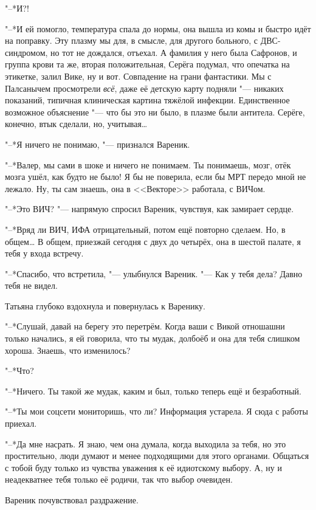 "--*И?!

"--*И ей помогло, температура спала до нормы, она вышла из комы и быстро идёт на поправку.
Эту плазму мы для, в смысле, для другого больного, с ДВС-синдромом, но тот не дождался, отъехал.
А фамилия у него была Сафронов, и группа крови та же, вторая положительная, Серёга подумал, что опечатка на этикетке, залил Вике, ну и вот.
Совпадение на грани фантастики.
Мы с Палсанычем просмотрели \emph{всё}, даже её детскую карту подняли "--- никаких показаний, типичная клиническая картина тяжёлой инфекции.
Единственное возможное объяснение "--- что бы это ни было, в плазме были антитела.
Серёге, конечно, втык сделали, но, учитывая\ldots{}

"--*Я ничего не понимаю, "--- признался Вареник.

"--*Валер, мы сами в шоке и ничего не понимаем.
Ты понимаешь, мозг, отёк мозга ушёл, как будто не было!
Я бы не поверила, если бы МРТ передо мной не лежало.
Ну, ты сам знаешь, она в <<Векторе>> работала, с ВИЧом.

"--*Это ВИЧ? "--- напрямую спросил Вареник, чувствуя, как замирает сердце.

"--*Вряд ли ВИЧ, ИФА отрицательный, потом ещё повторно сделаем.
Но, в общем\ldots{}
В общем, приезжай сегодня с двух до четырёх, она в шестой палате, я тебя у входа встречу.

\asterism

\textspace

"--*Спасибо, что встретила, "--- улыбнулся Вареник.
"--- Как у тебя дела?
Давно тебя не видел.

Татьяна глубоко вздохнула и повернулась к Варенику.

"--*Слушай, давай на берегу это перетрём.
Когда ваши с Викой отношашни только начались, я ей говорила, что ты мудак, долбоёб и она для тебя слишком хороша.
Знаешь, что изменилось?

"--*Что?

"--*Ничего.
Ты такой же мудак, каким и был, только теперь ещё и безработный.

"--*Ты мои соцсети мониторишь, что ли?
Информация устарела.
Я сюда с работы приехал.

"--*Да мне насрать.
Я знаю, чем она думала, когда выходила за тебя, но это простительно, люди думают и менее подходящими для этого органами.
Общаться с тобой буду только из чувства уважения к её идиотскому выбору.
А, ну и неадекватнее тебя только её родичи, так что выбор очевиден.

Вареник почувствовал раздражение.

